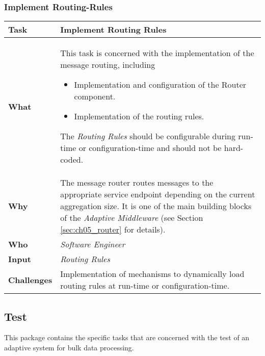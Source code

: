 \subsubsection{Implement Routing-Rules}
\begin{tabularx}{\textwidth}{@{} l X @{}}
	\caption{Implement Routing Rules} \label{table:ch6_Task_Implement_Routing_Rules}\\
	\toprule 
	\bfseries Task & Implement Routing Rules\\
	\midrule 
	\bfseries What & 
	This task is concerned with the implementation of the message routing, including
	\begin{itemize}
		\item Implementation and configuration of the Router component.
		\item Implementation of the routing rules.
	\end{itemize}
	The \emph{Routing Rules} should be configurable during run-time or configuration-time and should not be hard-coded.
	\\
	\midrule 
	\bfseries Why & The message router routes messages to the appropriate service endpoint depending on the current aggregation size. It is one of the main building blocks of the \emph{Adaptive Middleware} (see Section \ref{sec:ch05_router} for details).\\
	\midrule 
	\bfseries Who & \emph{Software Engineer}\\
	\midrule 
	\bfseries Input & \emph{Routing Rules}\\
	\midrule 
	\bfseries Challenges & Implementation of mechanisms to dynamically load routing rules at run-time or configuration-time.\\
	\bottomrule 
\end{tabularx}

\subsection{Test}
This package contains the specific tasks that are concerned with the test of an adaptive system for bulk data processing. 

